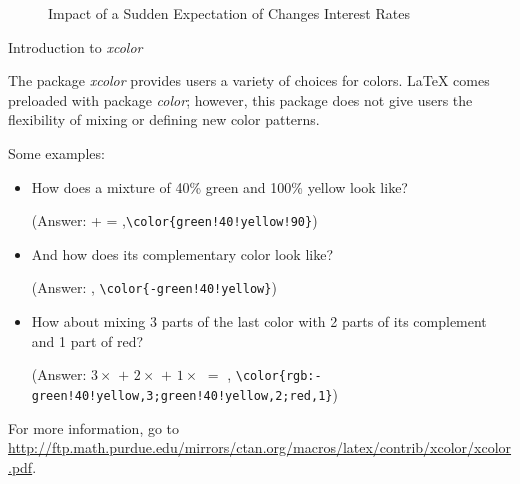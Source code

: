 \documentclass{beamer}\usepackage[]{graphicx}\usepackage[]{color}
\begin{document}
\begin{frame}
\begin{figure}[h]
{}
\caption{\footnotesize{Impact of a Sudden Expectation of Changes Interest Rates}}
\end{figure}

\end{frame}

\begin{frame}[fragile]{Introduction to \emph{\textrm{xcolor}}}

\textrm{The package \emph{xcolor} provides users a variety of choices for colors. LaTeX comes preloaded with package \emph{color}; however, this package does not give users the flexibility of mixing or defining new color patterns.}

\textrm{Some examples:}
\begin{itemize}
\pause \item How does a mixture of 40\% green and 100\% yellow look like?

{\footnotesize(Answer:  +  = ,\verb=\color{green!40!yellow!90}=)}

\pause \item And how does its complementary color look like?

{\footnotesize(Answer: , \verb=\color{-green!40!yellow}=)}

\pause \item How about mixing 3 parts of the last color with 2 parts of its complement and 1 part of red?

{\footnotesize(Answer: $3\times$ $+$ $2\times$ $+$ $1\times$ $=$ , \verb=\color{rgb:-green!40!yellow,3;green!40!yellow,2;red,1}=)}

\end{itemize}
\footnotesize{For more information, go to \url{http://ftp.math.purdue.edu/mirrors/ctan.org/macros/latex/contrib/xcolor/xcolor.pdf}.
}
\end{frame}
\end{document}
